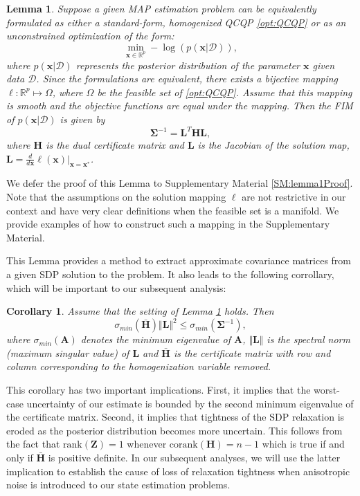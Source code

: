 \documentclass[lettersize,journal]{IEEEtran}
\newtheorem{lemma}[theorem]{Lemma}
\newtheorem{corollary}[theorem]{Corollary}
\begin{document}
{\begin{lemma}\label{thm:FisherInfo}
	Suppose a given MAP estimation problem can be equivalently formulated as either a standard-form, homogenized QCQP \eqref{opt:QCQP} or as an unconstrained optimization of the form:
	\begin{equation}\label{opt:unconstrained}
		\min\limits_{\bm{x}\in\mathbb{R}^p} -\log\left(p(\bm{x} \vert \bm{\mathcal{D}})\right),
	\end{equation}
	where $p(\bm{x} \vert \bm{\mathcal{D}})$ represents the posterior distribution of the parameter $\bm{x}$ given data $\bm{\mathcal{D}}$. Since the formulations are equivalent, there exists a bijective mapping $\bm{\ell}: \mathbb{R}^p \mapsto \Omega$, where $\Omega$ be the feasible set of \eqref{opt:QCQP}. Assume that this mapping is smooth and the objective functions are equal under the mapping. Then the FIM of $p(\bm{x} \vert \bm{\mathcal{D}})$ is given by
	\begin{equation}
		\bm{\Sigma}^{-1}= \bm{L}^T \bm{H}\bm{L},
	\end{equation}
	where $\bm{H}$ is the dual certificate matrix and $\bm{L}$ is the Jacobian of the solution map, $\bm{L} = \frac{d}{d\bm{x}}\bm{\ell}(\bm{x})\vert_{\bm{x}=\bm{x}^*}$. 
\end{lemma}

We defer the proof of this Lemma to Supplementary Material \ref{SM:lemma1Proof}. Note that the assumptions on the solution mapping $\bm{\ell}$ are not restrictive in our context and have very clear definitions when the feasible set is a manifold. We provide examples of how to construct such a mapping in the Supplementary Material.

This Lemma provides a method to extract approximate covariance matrices from a given SDP solution to the problem. It also leads to the following corrollary, which will be important to our subsequent analysis:
\begin{corollary}
	Assume that the setting of Lemma \ref{thm:FisherInfo} holds. Then
	\begin{equation}
		\sigma_{min}(\bar{\bm{H}}) \Vert \bm{L} \Vert^2 \leq \sigma_{min}(\bm{\Sigma}^{-1}),
	\end{equation}
	where $\sigma_{min}(\bm{A})$ denotes the minimum eigenvalue of $\bm{A}$, $\Vert \bm{L} \Vert$ is the spectral norm (maximum singular value) of $\bm{L}$ and $\bar{\bm{H}}$ is the certificate matrix with row and column corresponding to the homogenization variable removed.
\end{corollary}

This corollary has two important implications. First, it implies that the worst-case uncertainty of our estimate is bounded by the second minimum eigenvalue of the certificate matrix. Second, it implies that tightness of the SDP relaxation is eroded as the posterior distribution becomes more uncertain. This follows from the fact that $\mbox{rank}(\bm{Z})=1$ whenever $\mbox{corank}(\bm{H})=n-1$ which is true if and only if $\bar{\bm{H}}$ is positive definite. In our subsequent analyses, we will use the latter implication to establish the cause of loss of relaxation tightness when anisotropic noise is introduced to our state estimation problems. 
}
\end{document}

